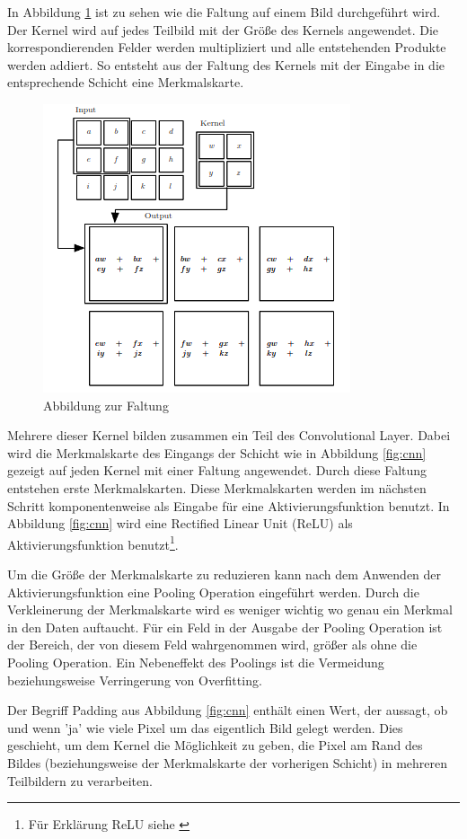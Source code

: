 In Abbildung \ref{fig:faltung} ist zu sehen wie die Faltung auf einem Bild durchgeführt wird. Der Kernel wird auf jedes Teilbild mit der Größe des Kernels angewendet. Die korrespondierenden Felder werden multipliziert und alle entstehenden Produkte werden addiert. So entsteht aus der Faltung des Kernels mit der Eingabe in die entsprechende Schicht eine Merkmalskarte.
\begin{figure}[H]
 \centering
 \includegraphics[width=0.45 \textwidth,keepaspectratio=true]{images/convolution.png}
 \caption{Abbildung zur Faltung \cite{CNNBook}}
 \label{fig:faltung}
\end{figure}
Mehrere dieser Kernel bilden zusammen ein Teil des Convolutional Layer. Dabei wird die Merkmalskarte des Eingangs der Schicht wie in Abbildung \ref{fig:cnn} gezeigt auf jeden Kernel mit einer Faltung angewendet. Durch diese Faltung entstehen erste Merkmalskarten. Diese Merkmalskarten werden im nächsten Schritt komponentenweise als Eingabe für eine Aktivierungsfunktion benutzt. In Abbildung \ref{fig:cnn} wird eine Rectified Linear Unit (ReLU) als Aktivierungsfunktion benutzt\footnote{Für Erklärung ReLU siehe \cite{neural}}.



Um die Größe der Merkmalskarte zu reduzieren kann nach dem Anwenden der Aktivierungsfunktion eine Pooling Operation eingeführt werden. Durch die Verkleinerung der Merkmalskarte wird es weniger wichtig wo genau ein Merkmal in den Daten auftaucht. Für ein Feld in der Ausgabe der Pooling Operation ist der Bereich, der von diesem Feld wahrgenommen wird, größer als ohne die Pooling Operation. Ein Nebeneffekt des Poolings ist die Vermeidung beziehungsweise Verringerung von Overfitting. 


Der Begriff Padding aus Abbildung \ref{fig:cnn} enthält einen Wert, der aussagt, ob und wenn 'ja' wie viele Pixel um das eigentlich Bild gelegt werden. Dies geschieht, um dem Kernel die Möglichkeit zu geben, die Pixel am Rand des Bildes (beziehungsweise der Merkmalskarte der vorherigen Schicht) in mehreren Teilbildern zu verarbeiten.



